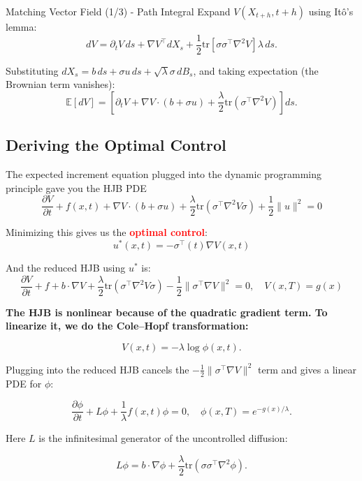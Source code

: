 \documentclass[aspectratio=169,xcolor=dvipsnames]{beamer}
\begin{document}
\begin{frame}[allowframebreaks]{Matching Vector Field (1/3) - Path Integral}
    Expand $V(X_{t+h}, t+h)$ using Itô's lemma:
    $$dV = \partial_t V \, ds + \nabla V^\top dX_s + \frac{1}{2} \text{tr}[\sigma\sigma^\top \nabla^2 V] \lambda \, ds.$$

    Substituting $dX_s = b \, ds + \sigma u \, ds + \sqrt{\lambda} \sigma \, dB_s$, and taking expectation (the Brownian term vanishes):
    $$\mathbb{E}[dV] = \left[\partial_t V + \nabla V \cdot (b + \sigma u) + \frac{\lambda}{2} \text{tr}(\sigma^\top \nabla^2 V) \right] ds.$$

    \vspace{0.5cm}
    
    \subsection*{Deriving the Optimal Control}

    The expected increment equation plugged into the dynamic programming principle gave you the HJB PDE
    $$\frac{\partial V}{\partial t} + f(x,t) + \nabla V \cdot (b + \sigma u) + \frac{\lambda}{2} \text{tr}(\sigma^\top \nabla^2 V \sigma) + \frac{1}{2} \|u\|^2 = 0 $$

    Minimizing this gives us the \textcolor{red}{\textbf{optimal control}}:
    $$u^*(x,t) = -\sigma^\top(t)\nabla V(x,t)$$

    And the reduced HJB using $u^*$ is:
    $$\frac{\partial V}{\partial t} + f + b \cdot \nabla V + \frac{\lambda}{2} \text{tr}(\sigma^\top \nabla^2 V \sigma) - \frac{1}{2} \|\sigma^\top \nabla V\|^2 = 0, \quad V(x,T) = g(x)$$

    \vspace{0.8cm}

    \textbf{The HJB is nonlinear because of the quadratic gradient term. To linearize it, we do the Cole–Hopf transformation:}

    $$V(x,t) = -\lambda \log \phi(x,t).$$

    \vspace{1.8cm}

    Plugging into the reduced HJB cancels the $-\frac{1}{2}\|\sigma^\top \nabla V\|^2$ term and gives a linear PDE for $\phi$:

    $$\frac{\partial \phi}{\partial t} + L\phi + \frac{1}{\lambda}f(x,t) \phi = 0, \quad \phi(x,T) = e^{-g(x)/\lambda}.$$

    Here $L$ is the infinitesimal generator of the uncontrolled diffusion:

    $$L\phi = b \cdot \nabla \phi + \frac{\lambda}{2} \text{tr}(\sigma\sigma^\top \nabla^2 \phi).$$
        

\end{frame}
\end{document}
